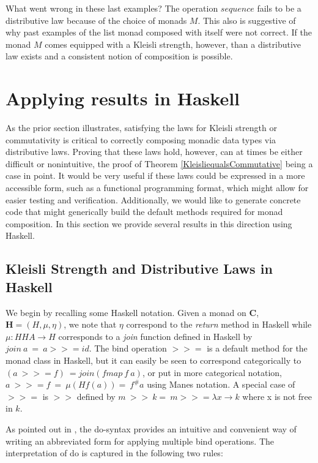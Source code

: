 \documentclass[submission,copyright]{eptcs}
\begin{document}
What went wrong in these last examples? The operation $sequence$ fails to be a distributive law because of the choice of monads $M$. This also is suggestive of why past examples of the list monad composed with itself were not correct. If the monad $M$ comes equipped with a Kleisli strength, however, than a distributive law exists and a consistent notion of composition is possible. 


\section{Applying results in Haskell} As the prior section illustrates, satisfying the laws for Kleisli strength or commutativity is critical to correctly composing monadic data types via distributive laws. Proving that these laws hold, however, can at times be either difficult or nonintuitive, the proof of Theorem \ref{KleisliequalsCommutative} being a case in point. It would be very useful if these laws could be expressed in a more accessible form, such as a functional programming format, which might allow for easier testing and verification.  Additionally, we would like to generate concrete code that might generically build the default methods required for monad composition. In this section we provide several results in this direction using Haskell.

\subsection{Kleisli Strength and Distributive Laws in Haskell}

We begin by recalling some Haskell notation. Given a monad on \textbf{C}, $\mathbf{H} = (H, \mu, \eta)$, we note that $\eta$ correspond to the {\it return} method in Haskell while $\mu: HHA \rightarrow H$ corresponds to a {\it join} function defined in Haskell by $join ~ a ~ = ~ a >>= id$. The bind operation $>>=$ is a default method for the monad class in Haskell, but it can easily be seen to correspond categorically to $(a~>>=f)~ = join(fmap~f~a)$, or put in more categorical notation, $a~>>=f ~= ~\mu(Hf(a)) = ~f^{\#}a$ using Manes notation. A special case of $>>=$ is $>>$ defined by $m ~>> ~k = ~m >>= \lambda x \rightarrow k$ where x is not free in $k$.




As pointed out in \cite{ArticleK}, the do-syntax provides an intuitive and convenient way of writing an abbreviated form for applying multiple bind operations. The interpretation of do is captured in the following two rules:
\end{document}
